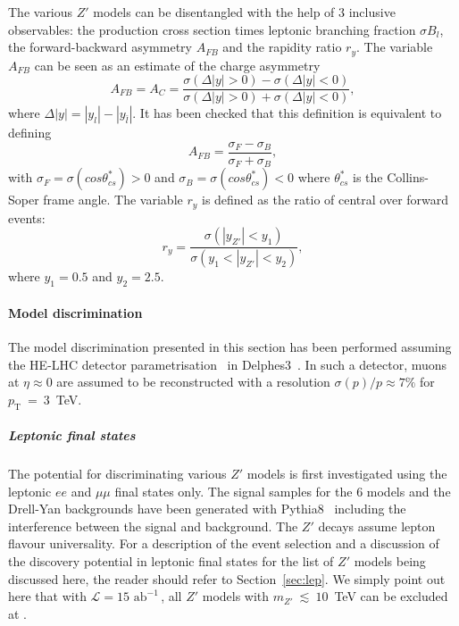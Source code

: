\documentclass[a4paper,11pt]{article}
\newcommand{\pt}{\ensuremath{p_{\text{T}}}}
\newcommand*{\intlumihelhc}{\ensuremath{\mathcal{L}=15\text{ ab}^{-1}}}
\newcommand{\py}{{\sc Pythia8}}
\newcommand{\delphes}{{\sc Delphes3}}
\begin{document}
The various $Z'$ models can be disentangled with the help of 3 inclusive observables: the production cross section times leptonic branching fraction $\sigma B_l$, the forward-backward asymmetry $A_{FB}$ and the rapidity ratio $r_y$. The variable $A_{FB}$ can be seen as an estimate of the charge asymmetry
\begin{equation}
A_{FB} = A_C =  \frac{\sigma(\Delta|y| > 0) - \sigma(\Delta|y| < 0)}{\sigma(\Delta|y| > 0) + \sigma(\Delta|y| < 0)},
\end{equation}
where $\Delta|y| = |y_l| - |y_{\bar{l}}|$. It has been checked that this definition is equivalent to defining
\begin{equation}
A_{FB} = \frac{\sigma_F - \sigma_B}{\sigma_F + \sigma_B},
\end{equation}
with $\sigma_F = \sigma (cos\theta^{*}_{cs})>0$ and $\sigma_B = \sigma (cos\theta^{*}_{cs})<0$ where $\theta^*_{cs}$ is the Collins-Soper frame angle. The variable $r_y$ is defined as the ratio of central over forward events:
\begin{equation}
r_y = \frac{\sigma(|y_{Z'}| < y_1)}{\sigma(y_1 < |y_{Z'}| <y_2)},
\end{equation}
where $y_1=0.5$ and $y_2=2.5$.

\paragraph*{Model discrimination}

The model discrimination presented in this section has been performed assuming the HE-LHC detector parametrisation~\cite{hlhelhc_web} in \delphes~\cite{deFavereau:2013fsa}. In such a detector, muons at $\eta \approx 0$ are assumed to be reconstructed with a resolution $\sigma(p)/p \approx 7\%$ for $\pt~=~3 $~TeV.

\subparagraph*{Leptonic final states}
\label{par:lepana}

The potential for discriminating various $Z'$ models is first investigated using the leptonic $ee$ and $\mu\mu$ final states only. The signal samples for the 6 models and the Drell-Yan backgrounds have been generated with \py~\cite{Sjostrand:2014zea} including the interference between the signal and background. The $Z'$ decays assume lepton flavour universality. For a description of the event selection and a discussion of the discovery potential in leptonic final states for the list of $Z'$ models being discussed here, the reader should refer to Section~\ref{sec:lep}. We simply point out here that with \intlumihelhc\,, all $Z'$ models with $m_{Z'}~\lesssim~10$~TeV can be excluded at \sqrtshelhc.
\end{document}
